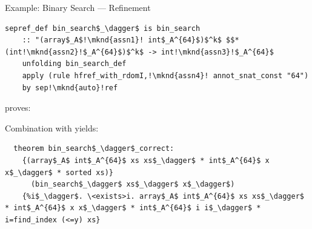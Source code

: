 \documentclass[fleqn]{beamer}
\begin{document}
\begin{frame}[fragile]{Example: Binary Search --- Refinement}
  \newcommand{\mknd}[1]{\makebox[0pt]{\tikz[remember picture]{\node (#1) {};}}}

  \begin{lstlisting}[escapechar=!]
  sepref_def bin_search$_\dagger$ is bin_search
    :: "(array$_A$!\mknd{assn1}! int$_A^{64}$)$^k$ $$* (int!\mknd{assn2}!$_A^{64}$)$^k$ -> int!\mknd{assn3}!$_A^{64}$
    unfolding bin_search_def
    apply (rule hfref_with_rdomI,!\mknd{assn4}! annot_snat_const "64")
    by sep!\mknd{auto}!ref
  \end{lstlisting}


  proves: 

  Combination with  yields:
  \begin{lstlisting}
  theorem bin_search$_\dagger$_correct:
    {(array$_A$ int$_A^{64}$ xs xs$_\dagger$ * int$_A^{64}$ x x$_\dagger$ * sorted xs)}
      (bin_search$_\dagger$ xs$_\dagger$ x$_\dagger$)
    {%i$_\dagger$. \<exists>i. array$_A$ int$_A^{64}$ xs xs$_\dagger$ * int$_A^{64}$ x x$_\dagger$ * int$_A^{64}$ i i$_\dagger$ * i=find_index (<=y) xs}
  \end{lstlisting}


\end{frame}
\end{document}
